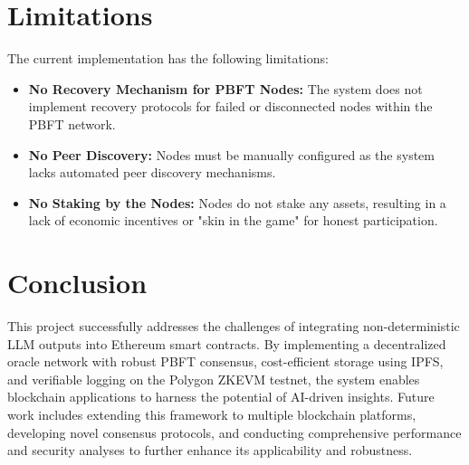 \documentclass[12pt]{article}
\begin{document}
\section{Limitations}
The current implementation has the following limitations:
\begin{itemize}
    \item \textbf{No Recovery Mechanism for PBFT Nodes:} The system does not implement recovery protocols for failed or disconnected nodes within the PBFT network.
    \item \textbf{No Peer Discovery:} Nodes must be manually configured as the system lacks automated peer discovery mechanisms.
    \item \textbf{No Staking by the Nodes:} Nodes do not stake any assets, resulting in a lack of economic incentives or "skin in the game" for honest participation.
\end{itemize}

\section{Conclusion}
This project successfully addresses the challenges of integrating non-deterministic LLM outputs into Ethereum smart contracts. By implementing a decentralized oracle network with robust PBFT consensus, cost-efficient storage using IPFS, and verifiable logging on the Polygon ZKEVM testnet, the system enables blockchain applications to harness the potential of AI-driven insights. Future work includes extending this framework to multiple blockchain platforms, developing novel consensus protocols, and conducting comprehensive performance and security analyses to further enhance its applicability and robustness.
\end{document}
